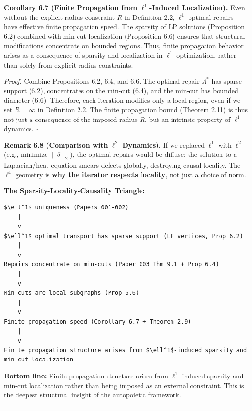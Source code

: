 \documentclass[
]{article}
\begin{document}
\textbf{Corollary 6.7 (Finite Propagation from \(\ell^1\)-Induced
Localization).} Even without the explicit radius constraint \(R\) in
Definition 2.2, \(\ell^1\) optimal repairs have effective finite
propagation speed. The sparsity of LP solutions (Proposition 6.2)
combined with min-cut localization (Proposition 6.6) ensures that
structural modifications concentrate on bounded regions. Thus, finite
propagation behavior arises as a consequence of sparsity and
localization in \(\ell^1\) optimization, rather than solely from
explicit radius constraints.

\emph{Proof.} Combine Propositions 6.2, 6.4, and 6.6. The optimal repair
\(\Lambda^*\) has sparse support (6.2), concentrates on the min-cut
(6.4), and the min-cut has bounded diameter (6.6). Therefore, each
iteration modifies only a local region, even if we set \(R = \infty\) in
Definition 2.2. The finite propagation bound (Theorem 2.11) is thus not
just a consequence of the imposed radius \(R\), but an intrinsic
property of \(\ell^1\) dynamics. \(\square\)

\textbf{Remark 6.8 (Comparison with \(\ell^2\) Dynamics).} If we
replaced \(\ell^1\) with \(\ell^2\) (e.g., minimize \(\|\delta\|_2\)),
the optimal repairs would be diffuse: the solution to a Laplacian/heat
equation smears defects globally, destroying causal locality. The
\(\ell^1\) geometry is \textbf{why the iterator respects locality}, not
just a choice of norm.

\textbf{The Sparsity-Locality-Causality Triangle:}

\begin{verbatim}
$\ell^1$ uniqueness (Papers 001-002)
    |
    v
$\ell^1$ optimal transport has sparse support (LP vertices, Prop 6.2)
    |
    v
Repairs concentrate on min-cuts (Paper 003 Thm 9.1 + Prop 6.4)
    |
    v
Min-cuts are local subgraphs (Prop 6.6)
    |
    v
Finite propagation speed (Corollary 6.7 + Theorem 2.9)
    |
    v
Finite propagation structure arises from $\ell^1$-induced sparsity and min-cut localization
\end{verbatim}

\textbf{Bottom line:} Finite propagation structure arises from
\(\ell^1\)-induced sparsity and min-cut localization rather than being
imposed as an external constraint. This is the deepest structural
insight of the autopoietic framework.

\begin{center}\rule{0.5\linewidth}{0.5pt}\end{center}
\end{document}
